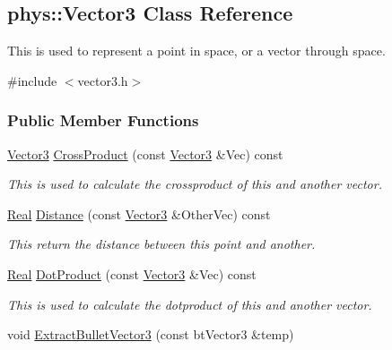 \hypertarget{classphys_1_1Vector3}{
\subsection{phys::Vector3 Class Reference}
\label{classphys_1_1Vector3}
}


This is used to represent a point in space, or a vector through space.  




{\ttfamily \#include $<$vector3.h$>$}

\subsubsection*{Public Member Functions}
\begin{DoxyCompactItemize}
\item 
\hyperlink{classphys_1_1Vector3}{Vector3} \hyperlink{classphys_1_1Vector3_ad9f0c1eee59e8a0d221eca49f49e0970}{CrossProduct} (const \hyperlink{classphys_1_1Vector3}{Vector3} \&Vec) const 
\begin{DoxyCompactList}\small\item\em This is used to calculate the crossproduct of this and another vector. \item\end{DoxyCompactList}\item 
\hyperlink{namespacephys_af7eb897198d265b8e868f45240230d5f}{Real} \hyperlink{classphys_1_1Vector3_af59a586331fe9497056b7e0f207658a3}{Distance} (const \hyperlink{classphys_1_1Vector3}{Vector3} \&OtherVec) const 
\begin{DoxyCompactList}\small\item\em This return the distance between this point and another. \item\end{DoxyCompactList}\item 
\hyperlink{namespacephys_af7eb897198d265b8e868f45240230d5f}{Real} \hyperlink{classphys_1_1Vector3_a1f5f1ad3c7e67a1e88b461d2b2ea5a8d}{DotProduct} (const \hyperlink{classphys_1_1Vector3}{Vector3} \&Vec) const 
\begin{DoxyCompactList}\small\item\em This is used to calculate the dotproduct of this and another vector. \item\end{DoxyCompactList}\item 
void \hyperlink{classphys_1_1Vector3_a6095aa79d2c288527fc4d7d7b69abf88}{ExtractBulletVector3} (const btVector3 \&temp)

\end{DoxyCompactItemize}
